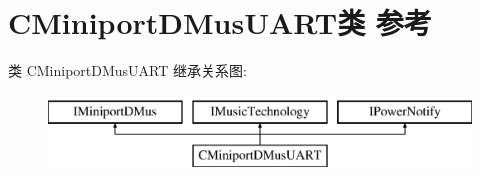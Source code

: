 \hypertarget{class_c_miniport_d_mus_u_a_r_t}{}\section{C\+Miniport\+D\+Mus\+U\+A\+R\+T类 参考}
\label{class_c_miniport_d_mus_u_a_r_t}
类 C\+Miniport\+D\+Mus\+U\+A\+RT 继承关系图\+:\begin{figure}[H]
\begin{center}
\leavevmode
\includegraphics[height=2.000000cm]{class_c_miniport_d_mus_u_a_r_t}
\end{center}
\end{figure}
